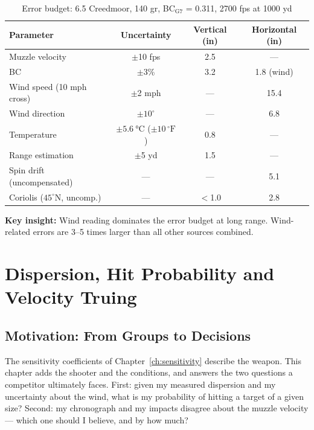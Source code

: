 \documentclass[11pt,twoside,openright]{report}
\newcommand{\degF}{\ensuremath{{}^{\circ}\mathrm{F}}}
\begin{document}
\begin{table}[H]
\centering
\caption{Error budget: 6.5 Creedmoor, 140 gr, BC$_{\text{G7}}$ = 0.311, 2700 fps at 1000 yd}
\label{tab:error_budget}
\small
\begin{tabular}{@{}lccc@{}}
\toprule
\textbf{Parameter} & \textbf{Uncertainty} & \textbf{Vertical (in)} & \textbf{Horizontal (in)} \\
\midrule
Muzzle velocity & $\pm$10 fps & 2.5 & --- \\
BC & $\pm$3\% & 3.2 & 1.8 (wind) \\
Wind speed (10 mph cross) & $\pm$2 mph & --- & 15.4 \\
Wind direction & $\pm 10^{\circ}$ & --- & 6.8 \\
Temperature & $\pm \SI{5.6}{\celsius}$ ($\pm 10\,\degF$) & 0.8 & --- \\
Range estimation & $\pm$5 yd & 1.5 & --- \\
Spin drift (uncompensated) & --- & --- & 5.1 \\
Coriolis ($45^{\circ}$N, uncomp.) & --- & $<$1.0 & 2.8 \\
\bottomrule
\end{tabular}
\end{table}

\textbf{Key insight:} Wind reading dominates the error budget at long range. Wind-related errors are 3--5 times larger than all other sources combined.


\chapter{Dispersion, Hit Probability and Velocity Truing}
\label{chap:dispersion}

\section{Motivation: From Groups to Decisions}

The sensitivity coefficients of Chapter~\ref{ch:sensitivity} describe the weapon. This chapter adds the shooter and the conditions, and answers the two questions a competitor ultimately faces. First: given my measured dispersion and my uncertainty about the wind, what is my probability of hitting a target of a given size? Second: my chronograph and my impacts disagree about the muzzle velocity --- which one should I believe, and by how much?
\end{document}
